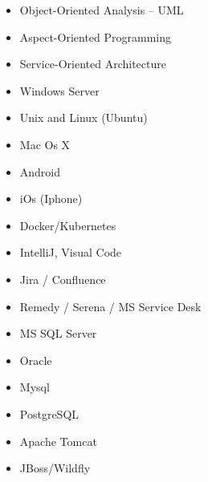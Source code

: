 \documentclass[11pt,a4paper,sans]{moderncv}
\begin{document}
\begin{cvcolumns}
	{\begin{itemize}
            \item Object-Oriented Analysis – UML 
            \item Aspect-Oriented Programming  
            \item Service-Oriented Architecture 
    \end{itemize}}
	{\begin{itemize}
            \item Windows Server  
            \item Unix and Linux (Ubuntu)
            \item Mac Os X 
            \item Android
            \item iOs (Iphone)
            \item Docker/Kubernetes
    \end{itemize}}
    \end{cvcolumns} 
    \begin{cvcolumns}
	{\begin{itemize}
            \item IntelliJ, Visual Code 
            \item Jira / Confluence 
            \item Remedy / Serena / MS Service Desk 
    \end{itemize}
    }
	{\begin{itemize}
            \item MS SQL Server
            \item Oracle
            \item Mysql
            \item PostgreSQL
    \end{itemize}}
 \end{cvcolumns} 
   \begin{cvcolumns}
	{\begin{itemize}
            \item Apache Tomcat 
            \item JBoss/Wildfly 
    \end{itemize}}
 \end{cvcolumns} 

\nocite{*}


\clearpage
\Large
\end{document}
